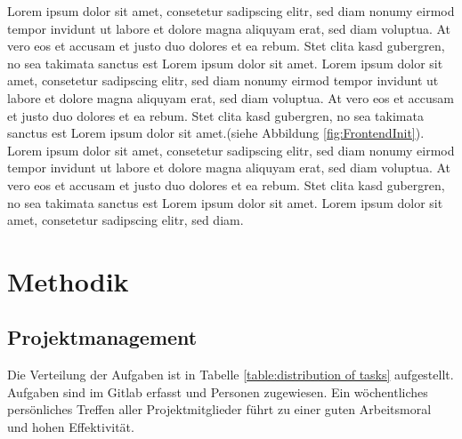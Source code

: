 \documentclass[a4paper]{spie}  %
\begin{document}
Lorem ipsum dolor sit amet, consetetur sadipscing elitr, sed diam nonumy eirmod tempor invidunt ut labore et dolore magna aliquyam erat, sed diam voluptua. At vero eos et accusam et justo duo dolores et ea rebum. Stet clita kasd gubergren, no sea takimata sanctus est Lorem ipsum dolor sit amet. Lorem ipsum dolor sit amet, consetetur sadipscing elitr, sed diam nonumy eirmod tempor invidunt ut labore et dolore magna aliquyam erat, sed diam voluptua. At vero eos et accusam et justo duo dolores et ea rebum. Stet clita kasd gubergren, no sea takimata sanctus est Lorem ipsum dolor sit amet.(siehe Abbildung \ref{fig:FrontendInit}).
\\
Lorem ipsum dolor sit amet, consetetur sadipscing elitr, sed diam nonumy eirmod tempor invidunt ut labore et dolore magna aliquyam erat, sed diam voluptua. At vero eos et accusam et justo duo dolores et ea rebum. Stet clita kasd gubergren, no sea takimata sanctus est Lorem ipsum dolor sit amet. Lorem ipsum dolor sit amet, consetetur sadipscing elitr, sed diam.

\section{Methodik} %
\subsection{Projektmanagement}
Die Verteilung der Aufgaben ist in Tabelle \ref{table:distribution of tasks} aufgestellt.
Aufgaben sind im Gitlab erfasst und Personen zugewiesen. Ein wöchentliches persönliches Treffen aller Projektmitglieder führt zu einer guten Arbeitsmoral und hohen Effektivität.
\end{document}
